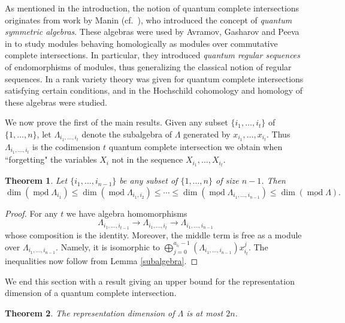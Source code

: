 \documentclass[a4paper]{amsart}
\newtheorem{theorem}{Theorem}[section]
\theoremstyle{definition}
\theoremstyle{definition}
\theoremstyle{definition}
\theoremstyle{definition}
\theoremstyle{definition}
\theoremstyle{definition}
\theoremstyle{remark}
\theoremstyle{remark}
\theoremstyle{definition}
\theoremstyle{definition}
\begin{document}
As mentioned in the introduction, the notion of quantum complete
intersections originates from work by Manin (cf.\ \cite{Manin}),
who introduced the concept of \emph{quantum symmetric algebras}.
These algebras were used by Avramov, Gasharov and Peeva in
\cite{Avramov} to study modules behaving homologically as modules
over commutative complete intersections. In particular, they
introduced \emph{quantum regular sequences} of endomorphisms of
modules, thus generalizing the classical notion of regular
sequences. In \cite{Benson} a rank variety theory was given for
quantum complete intersections satisfying certain conditions, and
in \cite{Bergh} the Hochschild cohomology and homology of these
algebras were studied.

We now prove the first of the main results. Given any subset $\{
i_1, \dots, i_t \}$ of $\{ 1, \dots, n \}$, let $\Lambda_{i_1,
\dots, i_t}$ denote the subalgebra of $\Lambda$ generated by
$x_{i_1}, \dots, x_{i_t}$. Thus $\Lambda_{i_1, \dots, i_t}$ is the
codimension $t$ quantum complete intersection we obtain when
``forgetting" the variables $X_i$ not in the sequence $X_{i_1},
\dots, X_{i_t}$.

\begin{theorem}\label{chain}
Let $\{ i_1, \dots, i_{n-1} \}$ be any subset of $\{ 1, \dots, n \}$
of size $n-1$. Then
$$\dim ( \underline{\operatorname{mod}\nolimits} \Lambda_{i_1} ) \le \dim (
\underline{\operatorname{mod}\nolimits} \Lambda_{i_1, i_2} ) \le \cdots \le \dim (
\underline{\operatorname{mod}\nolimits} \Lambda_{i_1, \dots, i_{n-1}} ) \le \dim (
\underline{\operatorname{mod}\nolimits} \Lambda ).$$
\end{theorem}

\begin{proof}
For any $t$ we have algebra homomorphisms
$$\Lambda_{i_1, \dots, i_{t-1}} \to \Lambda_{i_1, \dots, i_t} \to
\Lambda_{i_1, \dots, i_{n-1}}$$ whose composition is the identity.
Moreover, the middle term is free as a module over $\Lambda_{i_1,
\dots, i_{n-1}}$. Namely, it is isomorphic to
$\bigoplus_{j=0}^{a_{i_t}-1} ( \Lambda_{i_1, \dots, i_{n-1}}
)x_{i_t}^j$. The inequalities now follow from Lemma
\ref{subalgebra}.
\end{proof}

We end this section with a result giving an upper bound for the
representation dimension of a quantum complete intersection.

\begin{theorem}\label{upperbound}
The representation dimension of $\Lambda$ is at most $2n$.
\end{theorem}
\end{document}
